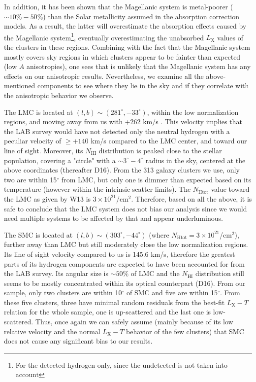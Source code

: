 \documentclass{aa}   %
\begin{document}
In addition, it has been shown \citep[e.g.,][and references therein]{magellanic,choudhury} that the Magellanic system is metal-poorer ($\sim 10\%-50\%$) than the Solar metallicity assumed in the absorption correction models. As a result, the latter will overestimate the absorption effects caused by the Magellanic system\footnote{For the detected hydrogen only, since the undetected is not taken into account}, eventually overestimating the unabsorbed $L_{\text{X}}$ values of the clusters in these regions. Combining with the fact that the Magellanic system mostly covers sky regions in which clusters appear to be fainter than expected (low $A$ anisotropies), one sees that is unlikely that the Magellanic system has any effects on our anisotropic results. Nevertheless, we examine all the above-mentioned components to see where they lie in the sky and if they correlate with the anisotropic behavior we observe. 


The LMC is located at  $(l,b)\sim (281^{\circ}, -33^{\circ})$, within the low normalization regions, and moving away from us with +262 km/s \citep{veloc_lmc}. This velocity implies that the LAB survey would have not detected only the neutral hydrogen with a peculiar velocity of $\geq +140$ km/s compared to the LMC center, and toward our line of sight. Moreover, its $N_{\text{HI}}$ distribution is peaked close to the stellar population, covering a "circle" with a $\sim3^{\circ}-4^{\circ}$ radius in the sky, centered at the above coordinates \citet{magellanic} (thereafter D16). From the 313 galaxy clusters we use, only two are within 15$^{\circ}$ from LMC, but only one is dimmer than expected based on its temperature (however within the intrinsic scatter limits). The $N_{\text{Htot}}$ value toward the LMC as given by W13 is $3 \times 10^{21}$/cm$^2$. Therefore, based on all the above, it is safe to conclude that the LMC system does not bias our analysis since we would need multiple systems to be affected by that and appear underluminous.

The SMC is located at $(l,b)\sim (303^{\circ}, -44^{\circ})$ (where $N_{\text{Htot}}=3 \times 10^{21}$/cm$^2$), further away than LMC but still moderately close the low normalization regions. Its line of sight velocity compared to us is 145.6 km/s, therefore the greatest parts of its hydrogen components are expected to have been accounted for from the LAB survey. Its angular size is $\sim 50\%$ of LMC and the $N_{\text{HI}}$ distribution still seems to be mostly concentrated within its optical counterpart (D16). From our sample, only two clusters are within 10$^{\circ}$ of SMC and five are within 15$^{\circ}$. From these five clusters, three have minimal random residuals from the best-fit $L_{\text{X}}-T$ relation for the whole sample, one is up-scattered and the last one is low-scattered. Thus, once again we can safely assume (mainly because of its low relative velocity and the normal $L_{\text{X}}-T$ behavior of the few clusters) that SMC does not cause any significant bias to our results.
\end{document}
